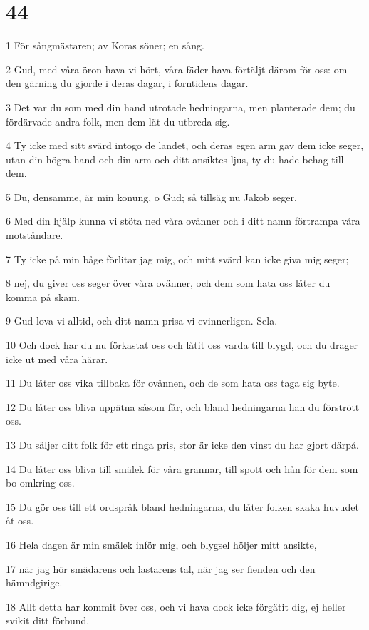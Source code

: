 \chapter{44}

\par 1 För sångmästaren; av Koras söner; en sång.
\par 2 Gud, med våra öron hava vi hört, våra fäder hava förtäljt därom för oss: om den gärning du gjorde i deras dagar, i forntidens dagar.
\par 3 Det var du som med din hand utrotade hedningarna, men planterade dem; du fördärvade andra folk, men dem lät du utbreda sig.
\par 4 Ty icke med sitt svärd intogo de landet, och deras egen arm gav dem icke seger, utan din högra hand och din arm och ditt ansiktes ljus, ty du hade behag till dem.
\par 5 Du, densamme, är min konung, o Gud; så tillsäg nu Jakob seger.
\par 6 Med din hjälp kunna vi stöta ned våra ovänner och i ditt namn förtrampa våra motståndare.
\par 7 Ty icke på min båge förlitar jag mig, och mitt svärd kan icke giva mig seger;
\par 8 nej, du giver oss seger över våra ovänner, och dem som hata oss låter du komma på skam.
\par 9 Gud lova vi alltid, och ditt namn prisa vi evinnerligen. Sela.
\par 10 Och dock har du nu förkastat oss och låtit oss varda till blygd, och du drager icke ut med våra härar.
\par 11 Du låter oss vika tillbaka för ovånnen, och de som hata oss taga sig byte.
\par 12 Du låter oss bliva uppätna såsom får, och bland hedningarna han du förstrött oss.
\par 13 Du säljer ditt folk för ett ringa pris, stor är icke den vinst du har gjort därpå.
\par 14 Du låter oss bliva till smälek för våra grannar, till spott och hån för dem som bo omkring oss.
\par 15 Du gör oss till ett ordspråk bland hedningarna, du låter folken skaka huvudet åt oss.
\par 16 Hela dagen är min smälek inför mig, och blygsel höljer mitt ansikte,
\par 17 när jag hör smädarens och lastarens tal, när jag ser fienden och den hämndgirige.
\par 18 Allt detta har kommit över oss, och vi hava dock icke förgätit dig, ej heller svikit ditt förbund.
